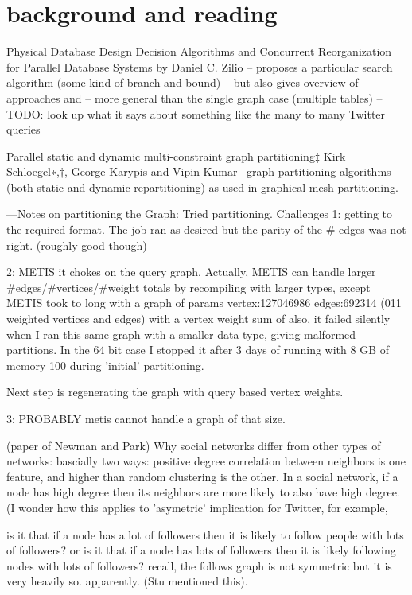 \documentclass{article}
\begin{document}
\section{background and reading}

Physical Database Design Decision Algorithms and
Concurrent Reorganization for
Parallel Database Systems
by
Daniel C. Zilio -- proposes a particular search algorithm (some kind of branch and bound)
-- but also gives overview of approaches and 
-- more general than the single graph case (multiple tables)
--TODO: look up what it says about something like the many to many Twitter queries


Parallel static and dynamic
multi-constraint graph
partitioning‡
Kirk Schloegel∗,†, George Karypis and Vipin Kumar
--graph partitioning algorithms (both static and dynamic repartitioning) as used in graphical mesh partitioning.

---Notes on partitioning the Graph:
Tried partitioning. Challenges 
1: getting to the required format. The job ran as desired but the parity of the # edges was not right. (roughly good though)

2: METIS it chokes on the query graph.
Actually, METIS can handle larger #edges/#vertices/#weight totals by recompiling with larger types, 
except METIS took to long with a graph of params vertex:127046986  edges:692314 (011 weighted vertices and edges)  with a vertex weight sum of
also, it failed silently when I ran this same graph with a smaller data type, giving malformed partitions.
In the 64 bit case I stopped it after 3 days of running with 8 GB of memory 100%
during 'initial' partitioning.

Next step is regenerating the graph with query based vertex weights.


3: PROBABLY metis cannot handle a graph of that size.


(paper of Newman and Park) Why social networks differ from other types of networks:
bascially two ways: positive degree correlation between neighbors is one feature, and higher than random clustering is the other.
In a social network, if a node has high degree then its neighbors are more likely to also have  high degree. 
(I wonder how this applies to 'asymetric' implication for Twitter, for example, 

is it that if a node has a lot of followers then it is likely to follow people with lots of followers?
or is it that if a node has lots of followers then it is likely following nodes with lots of followers?
recall, the follows graph is not symmetric but it is very heavily so. apparently. (Stu mentioned this).
 
\end{document}
